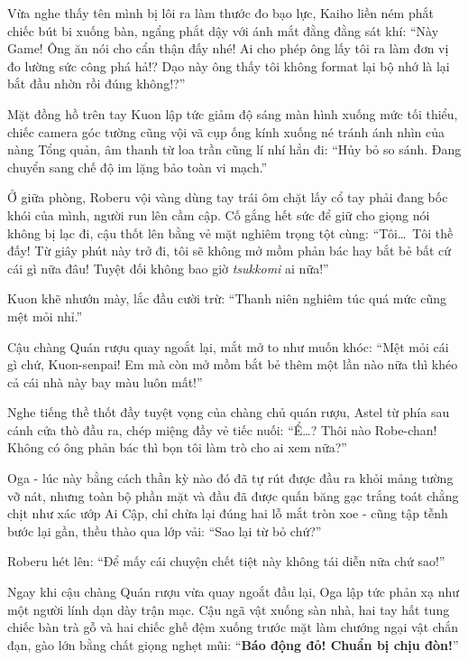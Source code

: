 \documentclass[../main.tex]{subfiles}
\begin{document}
Vừa nghe thấy tên mình bị lôi ra làm thước đo bạo lực, Kaiho liền ném phắt chiếc bút bi xuống bàn, ngẩng phắt dậy với ánh mắt đằng đằng sát khí: ``Này Game! Ông ăn nói cho cẩn thận đấy nhé! Ai cho phép ông lấy tôi ra làm đơn vị đo lường sức công phá hả!? Dạo này ông thấy tôi không format lại bộ nhớ là lại bắt đầu nhờn rồi đúng không!?''

Mặt đồng hồ trên tay Kuon lập tức giảm độ sáng màn hình xuống mức tối thiểu, chiếc camera góc tường cũng vội vã cụp ống kính xuống né tránh ánh nhìn của nàng Tổng quản, âm thanh từ loa trần cũng lí nhí hẳn đi: ``Hủy bỏ so sánh. Đang chuyển sang chế độ im lặng bảo toàn vi mạch.''

Ở giữa phòng, Roberu vội vàng dùng tay trái ôm chặt lấy cổ tay phải đang bốc khói của mình, người run lên cầm cập. Cố gắng hết sức để giữ cho giọng nói không bị lạc đi, cậu thốt lên bằng vẻ mặt nghiêm trọng tột cùng: ``Tôi\dots\ Tôi thề đấy! Từ giây phút này trở đi, tôi sẽ không mở mồm phản bác hay bắt bẻ bất cứ cái gì nữa đâu! Tuyệt đối không bao giờ \textit{tsukkomi} ai nữa!''

Kuon khẽ nhướn mày, lắc đầu cười trừ: ``Thanh niên nghiêm túc quá mức cũng mệt mỏi nhỉ.''

Cậu chàng Quán rượu quay ngoắt lại, mắt mở to như muốn khóc: ``Mệt mỏi cái gì chứ, Kuon-senpai! Em mà còn mở mồm bắt bẻ thêm một lần nào nữa thì khéo cả cái nhà này bay màu luôn mất!''

Nghe tiếng thề thốt đầy tuyệt vọng của chàng chủ quán rượu, Astel từ phía sau cánh cửa thò đầu ra, chép miệng đầy vẻ tiếc nuối: ``Ể\dots? Thôi nào Robe-chan! Không có ông phản bác thì bọn tôi làm trò cho ai xem nữa?''

Oga - lúc này bằng cách thần kỳ nào đó đã tự rút được đầu ra khỏi mảng tường vỡ nát, nhưng toàn bộ phần mặt và đầu đã được quấn băng gạc trắng toát chằng chịt như xác ướp Ai Cập, chỉ chừa lại đúng hai lỗ mắt tròn xoe - cũng tập tễnh bước lại gần, thều thào qua lớp vải: ``Sao lại từ bỏ chứ?''


Roberu hét lên: ``Để mấy cái chuyện chết tiệt này không tái diễn nữa chứ sao!''

Ngay khi cậu chàng Quán rượu vừa quay ngoắt đầu lại, Oga lập tức phản xạ như một người lính dạn dày trận mạc. Cậu ngã vật xuống sàn nhà, hai tay hất tung chiếc bàn trà gỗ và hai chiếc ghế đệm xuống trước mặt làm chướng ngại vật chắn đạn, gào lớn bằng chất giọng nghẹt mũi: ``\textbf{Báo động đỏ! Chuẩn bị chịu đòn!}''
\end{document}
